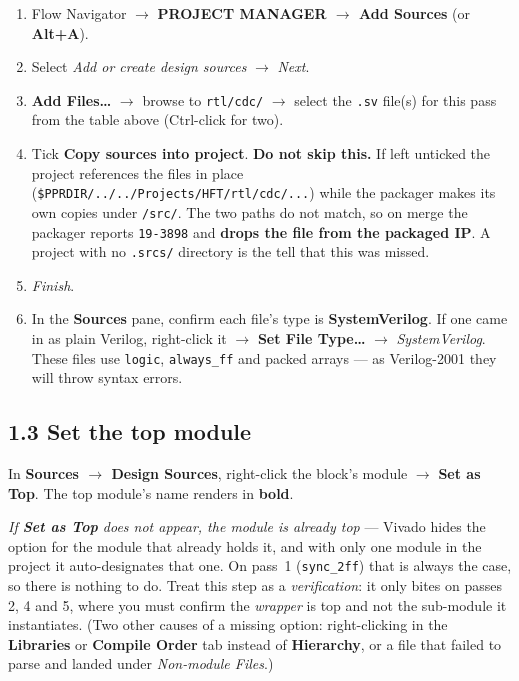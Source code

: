 \documentclass[10pt,a4paper]{article}
\newcommand{\code}[1]{\texttt{\small #1}}
\begin{document}
\begin{enumerate}[leftmargin=1.4em, itemsep=1pt]
\item Flow Navigator $\to$ \textbf{PROJECT MANAGER $\to$ Add Sources} (or
  \textbf{Alt+A}).
\item Select \emph{Add or create design sources} $\to$ \emph{Next}.
\item \textbf{Add Files\ldots} $\to$ browse to \code{rtl/cdc/} $\to$ select the
  \code{.sv} file(s) for this pass from the table above (Ctrl-click for two).
\item Tick \textbf{Copy sources into project}. \textbf{Do not skip this.} If left
  unticked the project references the files in place
  (\code{\$PPRDIR/../../Projects/HFT/rtl/cdc/...}) while the packager makes its own
  copies under \code{<ip-root>/src/}. The two paths do not match, so on merge the
  packager reports \code{19-3898} and \textbf{drops the file from the packaged IP}.
  A project with no \code{.srcs/} directory is the tell that this was missed.
\item \emph{Finish}.
\item In the \textbf{Sources} pane, confirm each file's type is
  \textbf{SystemVerilog}. If one came in as plain Verilog, right-click it $\to$
  \textbf{Set File Type\ldots} $\to$ \emph{SystemVerilog}. These files use
  \code{logic}, \code{always\_ff} and packed arrays --- as Verilog-2001 they will
  throw syntax errors.
\end{enumerate}

\subsection{1.3 Set the top module}

In \textbf{Sources $\to$ Design Sources}, right-click the block's module $\to$
\textbf{Set as Top}. The top module's name renders in \textbf{bold}.

\emph{If \textbf{Set as Top} does not appear, the module is already top} --- Vivado
hides the option for the module that already holds it, and with only one module in
the project it auto-designates that one. On pass~1 (\code{sync\_2ff}) that is always
the case, so there is nothing to do. Treat this step as a \emph{verification}: it
only bites on passes 2, 4 and 5, where you must confirm the \emph{wrapper} is top
and not the sub-module it instantiates. (Two other causes of a missing option:
right-clicking in the \textbf{Libraries} or \textbf{Compile Order} tab instead of
\textbf{Hierarchy}, or a file that failed to parse and landed under \emph{Non-module
Files}.)
\end{document}
